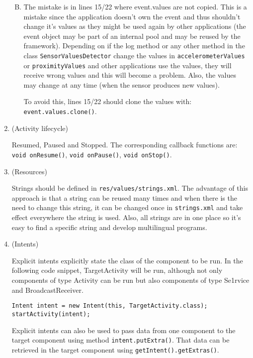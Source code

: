 \documentclass[11pt]{article}
\begin{document}
\begin{enumerate}
\begin{enumerate}[A)]
\begin{enumerate}[a)]
\end{enumerate}

\item
The mistake is in lines 15/22 where event.values are not copied. This is a mistake since the application doesn't own the event and thus shouldn't change it's values as they might be used again by other applications (the event object may be part of an internal pool and may be reused by the framework). Depending on if the log method or any other method in the class \lstinline{SensorValuesDetector} change the values in \lstinline{accelerometerValues} or \lstinline{proximityValues} and other applications use the values, they will receive wrong values and this will become a problem. Also, the values may change at any time (when the sensor produces new values).

To avoid this, lines 15/22 should clone the values with: \lstinline{event.values.clone()}.

\end{enumerate}

\item (Activity lifecycle)

Resumed, Paused and Stopped. The corresponding callback functions are:
\lstinline{void onResume()}, \lstinline{void onPause()}, \lstinline{void onStop()}.

\item (Resources)

Strings should be defined in \lstinline{res/values/strings.xml}. The advantage of this approach is that a string can be reused many times and when there is the need to change this string, it can be changed once in \lstinline{strings.xml} and take effect everywhere the string is used. Also, all strings are in one place so it's easy to find a specific string and develop multilingual programs.

\item (Intents)

Explicit intents explicitly state the class of the component to be run. In the following code snippet, TargetActivity will be run, although not only components of type Activity can be run but also components of type Se1rvice and BroadcastReceiver.

\begin{lstlisting}
Intent intent = new Intent(this, TargetActivity.class);
startActivity(intent);
\end{lstlisting}

Explicit intents can also be used to pass data from one component to the target component using method \lstinline{intent.putExtra()}. That data can be retrieved in the target component using \lstinline{getIntent().getExtras()}.


\end{enumerate}
\end{document}
